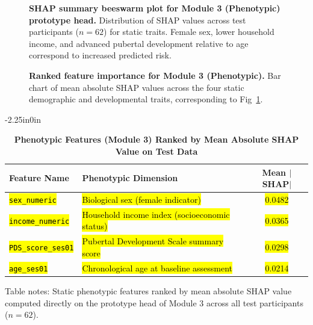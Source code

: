 \documentclass[10pt,letterpaper]{article}
\begin{document}
\begin{figure}[!h]
\caption{\textbf{SHAP summary beeswarm plot for Module 3 (Phenotypic) prototype head.}
Distribution of SHAP values across test participants ($n=62$) for static traits. Female sex, lower household income, and advanced pubertal development relative to age correspond to increased predicted risk.}
\label{fig:module3_shap_summary}
\end{figure}

\begin{figure}[!h]
\caption{\textbf{Ranked feature importance for Module 3 (Phenotypic).}
Bar chart of mean absolute SHAP values across the four static demographic and developmental traits, corresponding to Fig~\ref{fig:module3_shap_summary}.}
\label{fig:module3_bar}
\end{figure}

\begin{table}[!t]
\begin{adjustwidth}{-2.25in}{0in}
\centering
\caption{\textbf{Phenotypic Features (Module 3) Ranked by Mean Absolute SHAP Value on Test Data}}
\label{tab:module3_shap}
\footnotesize
\renewcommand{\arraystretch}{1.2}
\begin{tabular}{|l|l|c|}
\hline
\textbf{Feature Name} & \textbf{Phenotypic Dimension} & \textbf{Mean $|$SHAP$|$} \\
\hline
\hl{\texttt{sex\_numeric}} & \hl{Biological sex (female indicator)} & \hl{0.0482} \\
\hline
\hl{\texttt{income\_numeric}} & \hl{Household income index (socioeconomic status)} & \hl{0.0365} \\
\hline
\hl{\texttt{PDS\_score\_ses01}} & \hl{Pubertal Development Scale summary score} & \hl{0.0298} \\
\hline
\hl{\texttt{age\_ses01}} & \hl{Chronological age at baseline assessment} & \hl{0.0214} \\
\hline
\end{tabular}
\begin{flushleft}
Table notes: Static phenotypic features ranked by mean absolute SHAP value computed directly on the prototype head of Module 3 across all test participants ($n=62$).
\end{flushleft}
\end{adjustwidth}
\end{table}
\end{document}
